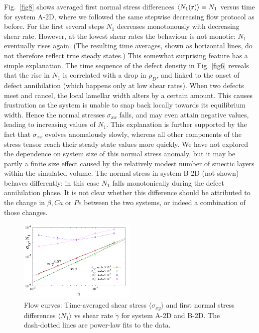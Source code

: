 \documentclass[8.5pt,twoside,twocolumn]{article}
\begin{document}
Fig.~\ref{fig8} shows averaged first normal stress differences $\langle N_1({\bf r})\rangle \equiv N_1$ versus time for system A-2D, where we followed the same stepwise decreasing flow protocol as before.
For the first several steps $N_1$ decreases monotonously with decreasing shear rate.
However, at the lowest shear rates the behaviour is not monotic: $N_1$ eventually rises again. (The resulting time averages, shown as horizontal lines, do not therefore reflect true steady states.)
This somewhat surprising feature has a simple explanation. 
The time sequence of the defect density in Fig. \ref{fig6} reveals that the rise in $N_1$ is correlated with a drop in $\rho_D$, and linked to the onset of defect annihilation (which happens only at low shear rates).
When two defects meet and cancel, the local lamellar width alters by a certain amount. This causes frustration as the system is unable to snap back locally towards its equilibrium width. Hence the normal stresses $\sigma_{xx}$ falls, and may even attain negative values, leading to increasing values of $N_1$.
This explanation is further supported by the fact that $\sigma_{xx}$ evolves anomalously slowly, whereas all other components of the stress tensor reach their steady state values more quickly. We have not explored the dependence on system size of this normal stress anomaly, but it may be partly a finite size effect caused by the relatively modest number of smectic layers within the simulated volume.
The normal stress in system B-2D (not shown) behaves differently: in this case $N_1$ falls monotonically during the defect annihilation phase. 
It is not clear whether this difference should be attributed to the change in $\beta, Ca$ or $Pe$ between the two systems, or indeed a combination of those changes.

\begin{figure}[htp!]
\centering
\includegraphics[angle=0,width=0.5\textwidth]{S_xy_N1_gammadot.pdf}
\caption{Flow curves: Time-averaged shear stress $\langle \sigma_{xy}\rangle$ and first normal stress differences $\langle N_1 \rangle$ vs shear rate $\dot{\gamma}$ for system A-2D and B-2D. The dash-dotted lines are power-law fits to the data.} 
\label{fig9}
\end{figure}
\end{document}
